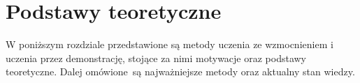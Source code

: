 \chapter{Podstawy teoretyczne}
W poniższym rozdziale przedstawione są metody uczenia ze wzmocnieniem i uczenia przez demonstrację, stojące za nimi motywacje oraz podstawy teoretyczne. Dalej omówione są najważniejsze metody oraz aktualny stan wiedzy.

%








